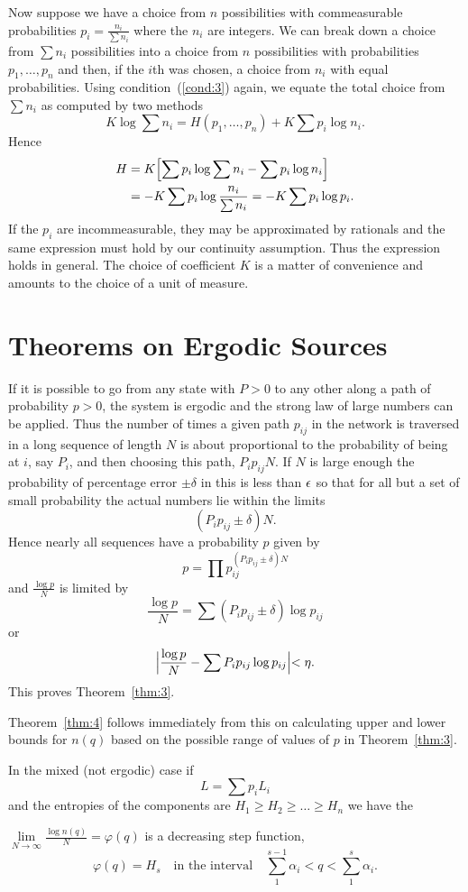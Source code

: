 Now suppose we have a choice from $n$ possibilities with commeasurable
probabilities $\displaystyle p_i=\frac{n_i}{\sum n_i}$ where the $n_i$
are integers.  We can break down a choice from $\sum n_i$ possibilities
into a choice from $n$ possibilities with probabilities $p_1,\dots,p_n$
and then, if the $i$th was chosen, a choice from $n_i$ with
equal probabilities.  Using condition~(\ref{cond:3}) again, we equate
the total choice from $\sum n_i$ as computed by two methods
$$
K\log\sum n_i=H(p_1,\dots,p_n)+K\sum p_i\log n_i.
$$
Hence
\begin{align*}
H&=K\Bigl[\sum p_i\log\sum n_i-\sum p_i\log n_i\Bigr]\\
&=-K\sum p_i\log\frac{n_i}{\sum n_i}=-K\sum p_i\log p_i.
\end{align*}
If the $p_i$ are incommeasurable, they may be approximated by rationals and
the same expression must hold by our continuity assumption.  Thus the
expression holds in general.  The choice of coefficient $K$ is a matter of
convenience and amounts to the choice of a unit of measure.

\section{Theorems on Ergodic Sources}
\label{ap:3}

If it is possible to go from any state with $P>0$ to any other along a path
of probability $p>0$, the system is ergodic and the strong law of large
numbers can be applied.  Thus the number of times a given path $p_{ij}$ in the
network is traversed in a long sequence of length $N$ is about proportional
to the probability of being at $i$, say $P_i$, and then choosing this
path, $P_ip_{ij}N$.  If $N$ is large enough the probability of percentage
error $\pm\delta$ in this is less than $\epsilon$ so that for all but a set of
small probability the actual numbers lie within the limits
$$
(P_ip_{ij}\pm\delta)N.
$$
Hence nearly all sequences have a probability $p$ given by
$$
p=\prod p_{ij}^{(P_ip_{ij}\pm\delta)N}
$$
and $\displaystyle\frac{\log p}{N}$ is limited by
$$
\frac{\log p}{N}=\sum(P_ip_{ij}\pm\delta)\log p_{ij}
$$
or
$$
\Bigl|\frac{\log p}{N}-\sum P_ip_{ij}\log p_{ij}\Bigl|<\eta.
$$
This proves Theorem~\ref{thm:3}.

Theorem~\ref{thm:4} follows immediately from this on calculating upper and
lower bounds for $n(q)$ based on the possible range of values of $p$ in
Theorem~\ref{thm:3}.

In the mixed (not ergodic) case if
$$
L=\sum p_i L_i
$$
and the entropies of the components are $H_1\geq H_2\geq\dots\geq H_n$ we
have the
\begin{theorem*}
$\lim\limits_{N\to\infty}\frac{\log n(q)}{N}=\varphi(q)$ is a decreasing step function,
$$
\varphi(q)=H_s
\quad\text{in the interval}\quad
\sum_1^{s-1}\alpha_i<q<\sum_1^s\alpha_i.
$$
\end{theorem*}


